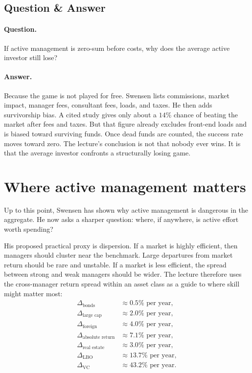 \subsection{Question \& Answer}

\paragraph{Question.} If active management is zero-sum before costs, why does the average active investor still lose?

\paragraph{Answer.} Because the game is not played for free. Swensen lists commissions, market impact, manager fees, consultant fees, loads, and taxes. He then adds survivorship bias. A cited study gives only about a \(14\%\) chance of beating the market after fees and taxes. But that figure already excludes front-end loads and is biased toward surviving funds. Once dead funds are counted, the success rate moves toward zero. The lecture's conclusion is not that nobody ever wins. It is that the average investor confronts a structurally losing game.

\section{Where active management matters}

Up to this point, Swensen has shown why active management is dangerous in the aggregate. He now asks a sharper question: where, if anywhere, is active effort worth spending?

His proposed practical proxy is dispersion. If a market is highly efficient, then managers should cluster near the benchmark. Large departures from market return should be rare and unstable. If a market is less efficient, the spread between strong and weak managers should be wider. The lecture therefore uses the cross-manager return spread within an asset class as a guide to where skill might matter most:
\begin{align}
\Delta_{\text{bonds}} &\approx 0.5\% \text{ per year},\\
\Delta_{\text{large cap}} &\approx 2.0\% \text{ per year},\\
\Delta_{\text{foreign}} &\approx 4.0\% \text{ per year},\\
\Delta_{\text{absolute return}} &\approx 7.1\% \text{ per year},\\
\Delta_{\text{real estate}} &\approx 3.0\% \text{ per year},\\
\Delta_{\text{LBO}} &\approx 13.7\% \text{ per year},\\
\Delta_{\text{VC}} &\approx 43.2\% \text{ per year}.
\end{align}


